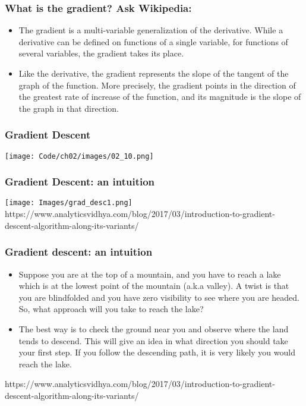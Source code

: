 \documentclass{beamer}
\begin{document}
\begin{frame}
\frametitle{What is the gradient? Ask Wikipedia:}
\begin{itemize}
\item The gradient is a multi-variable generalization of the derivative. While a derivative can be defined on functions of a single variable, for functions of several variables, the gradient takes its place.
\item Like the derivative, the gradient represents the slope of the tangent of the graph of the function. More precisely, the gradient points in the direction of the greatest rate of increase of the function, and its magnitude is the slope of the graph in that direction.
\end{itemize}
\end{frame}

\begin{frame}
  \frametitle{Gradient Descent}
  \texttt{[image: Code/ch02/images/02\_10.png]}
\end{frame}

\begin{frame}
  \frametitle{Gradient Descent: an intuition}
  \center
  \texttt{[image: Images/grad\_desc1.png]}
  \tiny
  \vspace{0.2in}
  https://www.analyticsvidhya.com/blog/2017/03/introduction-to-gradient-descent-algorithm-along-its-variants/
\end{frame}

\begin{frame}
  \frametitle{Gradient descent: an intuition}
  \begin{itemize}
  \item Suppose you are at the top of a mountain, and you have to reach a lake which is at the lowest point of the mountain (a.k.a valley). A twist is that you are blindfolded and you have zero visibility to see where you are headed. So, what approach will you take to reach the lake?
  \item The best way is to check the ground near you and observe where the land tends to descend. This will give an idea in what direction you should take your first step. If you follow the descending path, it is very likely you would reach the lake.
  \end{itemize}
  \vspace{0.2in}
  \tiny
  https://www.analyticsvidhya.com/blog/2017/03/introduction-to-gradient-descent-algorithm-along-its-variants/
\end{frame}
\end{document}

